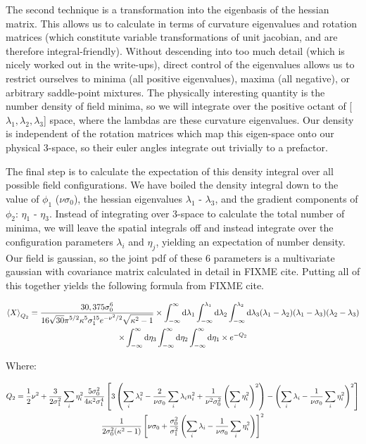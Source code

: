 \documentclass[10pt,letterpaper]{article}
\def\half{{1 \over 2}}
\def\d{{\rm d}}  %
\def\expect#1{\left\langle #1 \right\rangle} %
\def\intinf{\int_{-\infty}^{\infty}}
\begin{document}
\par The second technique is a transformation into the eigenbasis of the hessian matrix. This allows us to calculate in terms of curvature eigenvalues and rotation matrices (which constitute variable transformations of unit jacobian, and are therefore integral-friendly). Without descending into too much detail (which is nicely worked out in the write-ups), direct control of the eigenvalues allows us to restrict ourselves to minima (all positive eigenvalues), maxima (all negative), or arbitrary saddle-point mixtures. The physically interesting quantity is the number density of field minima, so we will integrate over the positive octant of [$\lambda_1, \lambda_2, \lambda_3$] space, where the lambdas are these curvature eigenvalues. Our density is independent of the rotation matrices which map this eigen-space onto our physical 3-space, so their euler angles integrate out trivially to a prefactor.
\par The final step is to calculate the expectation of this density integral over all possible field configurations. We have boiled the density integral down to the value of $\phi_1$ ($\nu \sigma_0$), the hessian eigenvalues $\lambda_1$ - $\lambda_3$, and the gradient components of $\phi_2$: $\eta_1$ - $\eta_3$. Instead of integrating over 3-space to calculate the total number of minima, we will leave the spatial integrals off and instead integrate over the configuration parameters $\lambda_i$ and $\eta_j$, yielding an expectation of number density. Our field is gaussian, so the joint pdf of these 6 parameters is a multivariate gaussian with covariance matrix calculated in detail in FIXME cite. Putting all of this together yields the following formula from FIXME cite.

\begin{gather} \label{eq:allspace_integral}
\expect{X}_{Q_2} = \frac{\displaystyle 30,375 \sigma_0^6}{\displaystyle 16 \sqrt{30} \pi^{5/2} \kappa^5 \sigma_1^{15}e^{-\nu^2/2} \sqrt{\kappa^2-1}} \times \int_{-\infty}^{\infty} \d \lambda_1 
     \int_{-\infty}^{\lambda_1} \d \lambda_2 
     \int_{-\infty}^{\lambda_2} \d \lambda_3 (\lambda_1 -
     \lambda_2) (\lambda_1 - \lambda_3) (\lambda_2 - \lambda_3) \\
     \times \intinf \d \eta_{3} 
     \intinf \d \eta_{2} 
     \intinf \d \eta_{1}  \times  e^{- Q_2} \nonumber
\end{gather}


Where:

\begin{gather} \label{eq:Q2}
Q_2 = \half \nu^2 + {3 \over 2 \sigma_1^2} \sum_{i} \nonumber
     \eta_{i}^2
     {5 \sigma_0^2 \over 4 \kappa^2 \sigma_1^4} \left[3
     \left( \sum_i \lambda_i^2 - {2 \over \nu \sigma_0} \sum_i
     \lambda_i  n_i^2 + {1 \over \nu^2 \sigma_0^2} \left(
     \sum_i \eta_i^2 \right)^2\right) - \left(\sum_i
     \lambda_i - {1 \over \nu \sigma_0} \sum_i \eta_i^2
     \right)^2\right]\\ 
     {1 \over 2 \sigma_0^2 (\kappa^2 - 1)}
     \left[\nu \sigma_0 + {\sigma_0^2 \over \sigma_1^2}
     \left(\sum_i \lambda_i - {1 \over \nu \sigma_0} \sum_i
     \eta_i^2 \right)\right]^2 \\ \nonumber
\end{gather}
\end{document}
